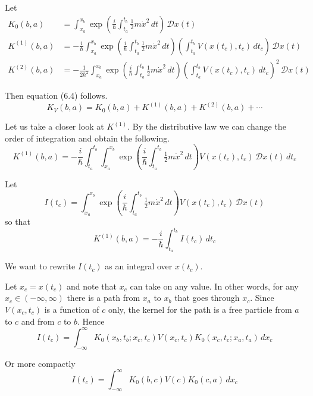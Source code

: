 \documentclass[12pt]{article}
\begin{document}
Let
\begin{align*}
K_0(b,a)&=\int_{x_a}^{x_b}\exp\left(\frac{i}{\hbar}\int_{t_a}^{t_b}\tfrac{1}{2}m\dot x^2\,dt\right)\,\mathcal Dx(t)
\tag{6.5}
\\
K^{(1)}(b,a)&=-\frac{i}{\hbar}
\int_{x_a}^{x_b}\exp\left(\frac{i}{\hbar}\int_{t_a}^{t_b}\tfrac{1}{2}m\dot x^2\,dt\right)
\left(\int_{t_a}^{t_b}V(x(t_c),t_c)\,dt_c\right)\,\mathcal Dx(t)
\\
K^{(2)}(b,a)&=-\frac{1}{2\hbar^2}
\int_{x_a}^{x_b}\exp\left(\frac{i}{\hbar}\int_{t_a}^{t_b}\tfrac{1}{2}m\dot x^2\,dt\right)
\left(\int_{t_a}^{t_b}V(x(t_c),t_c)\,dt_c\right)^2\,\mathcal Dx(t)
\end{align*}

Then equation (6.4) follows.
\begin{equation*}
K_V(b,a)=K_0(b,a)+K^{(1)}(b,a)+K^{(2)}(b,a)+\cdots
\tag{6.4}
\end{equation*}

Let us take a closer look at $K^{(1)}$.
By the distributive law we can change the order of integration
and obtain the following.
\begin{equation*}
K^{(1)}(b,a)=-\frac{i}{\hbar}
\int_{t_a}^{t_b}
\int_{x_a}^{x_b}\exp\left(\frac{i}{\hbar}\int_{t_a}^{t_b}\tfrac{1}{2}m\dot x^2\,dt\right)
V(x(t_c),t_c)
\,\mathcal Dx(t)\,dt_c
\end{equation*}

Let
\begin{equation*}
I(t_c)=
\int_{x_a}^{x_b}\exp\left(\frac{i}{\hbar}\int_{t_a}^{t_b}\tfrac{1}{2}m\dot x^2\,dt\right)
V(x(t_c),t_c)
\,\mathcal Dx(t)
\end{equation*}
so that
\begin{equation*}
K^{(1)}(b,a)=-\frac{i}{\hbar}\int_{t_a}^{t_b}I(t_c)\,dt_c
\end{equation*}

We want to rewrite $I(t_c)$ as an integral over $x(t_c)$.

\bigskip
Let $x_c=x(t_c)$ and note that $x_c$ can take on any value.
In other words, for any $x_c\in(-\infty,\infty)$ there is a path from $x_a$ to $x_b$
that goes through $x_c$.
Since $V(x_c,t_c)$ is a function of $c$ only,
the kernel for the path is a free particle from $a$ to $c$ and from $c$ to $b$.
Hence
\begin{equation*}
I(t_c)=\int_{-\infty}^{\infty}
K_0(x_b,t_b;x_c,t_c)V(x_c,t_c)K_0(x_c,t_c;x_a,t_a)
\,dx_c
\end{equation*}

Or more compactly
\begin{equation*}
I(t_c)=\int_{-\infty}^{\infty}
K_0(b,c)V(c)K_0(c,a)
\,dx_c
\end{equation*}
\end{document}
